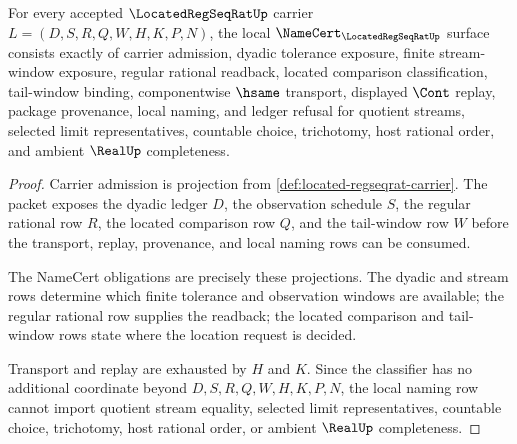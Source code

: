 \begin{theorem}
\label{thm:located-regseqrat-namecert-obligations}
For every accepted $\LocatedRegSeqRatUp$ carrier $L=(D,S,R,Q,W,H,K,P,N)$, the local $\NameCert_{\LocatedRegSeqRatUp}$ surface consists exactly of carrier admission, dyadic tolerance exposure, finite stream-window exposure, regular rational readback, located comparison classification, tail-window binding, componentwise $\hsame$ transport, displayed $\Cont$ replay, package provenance, local naming, and ledger refusal for quotient streams, selected limit representatives, countable choice, trichotomy, host rational order, and ambient $\RealUp$ completeness.
\end{theorem}
\begin{proof}
Carrier admission is projection from \autoref{def:located-regseqrat-carrier}. The packet exposes the dyadic ledger $D$, the observation schedule $S$, the regular rational row $R$, the located comparison row $Q$, and the tail-window row $W$ before the transport, replay, provenance, and local naming rows can be consumed.

The NameCert obligations are precisely these projections. The dyadic and stream rows determine which finite tolerance and observation windows are available; the regular rational row supplies the readback; the located comparison and tail-window rows state where the location request is decided.

Transport and replay are exhausted by $H$ and $K$. Since the classifier has no additional coordinate beyond $D,S,R,Q,W,H,K,P,N$, the local naming row cannot import quotient stream equality, selected limit representatives, countable choice, trichotomy, host rational order, or ambient $\RealUp$ completeness.
\end{proof}


